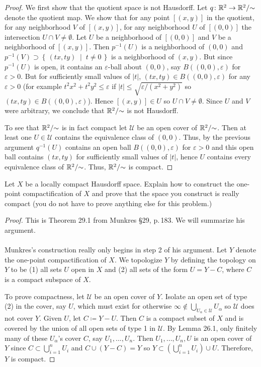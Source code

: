\begin{proof}
We first show that the quotient space is not Hausdorff. Let
$q\colon\mathbb{R}^2\to\mathbb{R}^2/{\sim}$ denote the quotient map. We show that for any
point $[(x,y)]$ in the quotient, for any neighborhood $V$ of $[(x,y)]$, for
any neighborhood $U$ of $[(0,0)]$ the intersection $U\cap
V\neq\emptyset$. Let $U$ be a neighborhood of $[(0,0)]$ and $V$ be a
neighborhood of $[(x,y)]$. Then $p^{-1}(U)$ is a neighborhood of $(0,0)$
and $p^{-1}(V)\supset\left\{\,(tx,ty)\;\middle|\;t\neq 0\,\right\}$ is a
neighborhood of $(x,y)$. But since $p^{-1}(U)$ is open, it contains an
$\varepsilon$-ball about $(0,0)$, say $B((0,0),\varepsilon)$ for
$\varepsilon>0$. But for sufficiently small values of $|t|$, $(tx,ty)\in
B((0,0),\varepsilon)$ for any $\varepsilon>0$ (for example
$t^2x^2+t^2y^2\leq\varepsilon$ if $|t|\leq \sqrt{\varepsilon/(x^2+y^2)}$ so
$(tx,ty)\in B((0,0),\varepsilon)$). Hence $[(x,y)]\in U$ so $U\cap V\neq
\emptyset$. Since $U$ and $V$ were arbitrary, we conclude that
$\mathbb{R}^2/{\sim}$ is not Hausdorff.

To see that $\mathbb{R}^2/{\sim}$ is in fact compact let $\mathcal{U}$ be an open
cover of $\mathbb{R}^2/{\sim}$. Then at least one $U\in\mathcal{U}$ contains the
equivalence class of $(0,0)$. Thus, by the previous argument $q^{-1}(U)$
contains an open ball $B((0,0),\varepsilon)$ for $\varepsilon>0$ and this
open ball contains $(tx,ty)$ for sufficiently small values of $|t|$, hence
$U$ contains every equivalence class of $\mathbb{R}^2/{\sim}$. Thus,
$\mathbb{R}^2/{\sim}$ is compact.
\end{proof}
\begin{problem}
Let $X$ be a locally compact Hausdorff space. Explain how to
construct the one-point compactification of $X$ and prove that
the space you construct is really compact (you do not have to
prove anything else for this problem.)
\end{problem}
\begin{proof}
This is Theorem 29.1 from Munkres \S29, p.\,183. We will summarize his
argument.
\\\\
Munkres's construction really only begins in step 2 of his argument. Let
$Y$ denote the one-point compactification of $X$. We topologize $Y$ by
defining the topology on $Y$ to be (1) all sets $U$ open in $X$ and (2)
all sets of the form $U=Y-C$, where $C$ is a compact subspace of $X$.

To prove compactness, let $\mathcal{U}$ be an open cover of $Y$. Isolate an
open set of type (2) in the cover, say $U$, which must exist for otherwise
$\infty\notin\bigcup_{U_\alpha\in\mathcal{U}}U_\alpha$ so $\mathcal{U}$
does not cover $Y$. Given $U$, let $C\coloneqq Y-U$. Then $C$ is a compact
subset of $X$ and is covered by the union of all open sets of type 1 in
$\mathcal{U}$. By Lemma 26.1, only finitely many of these $U_\alpha$'s
cover $C$, say $U_1,...,U_n$. Then $U_1,...,U_n,U$ is an open cover of
$Y$ since $C\subset\bigcup_{i=1}^n U_i$ and $C\cup (Y-C)=Y$ so
$Y\subset\left(\bigcup_{i=1}^n U_i\right)\cup U$. Therefore, $Y$ is
compact.
\end{proof}
